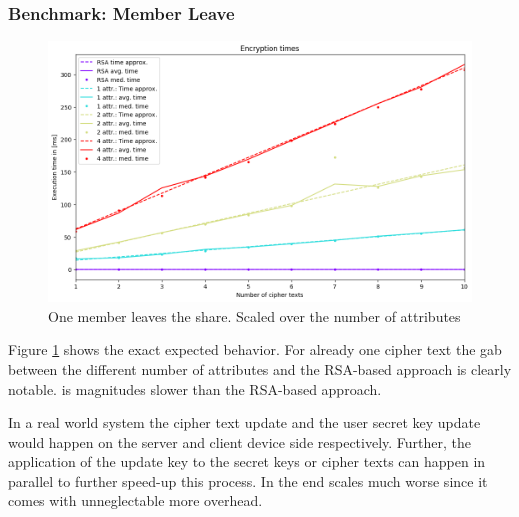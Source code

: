 \subsubsection{Benchmark: Member Leave}
\begin{figure}[!ht]
\centering
    \includegraphics[width=\linewidth]{img/eval-leave/leave_attr_1_users_2.png}
    \caption{One member leaves the share. Scaled over the number of attributes}
    \label{fig:member-leave}
\end{figure}

Figure \ref{fig:member-leave} shows the exact expected behavior. For already one cipher text the gab between the different number of attributes and the RSA-based approach is clearly notable. \name is magnitudes slower than the RSA-based approach.

In a real world system the cipher text update and the user secret key update would happen on the server and client device side respectively. Further, the application of the update key to the secret keys or cipher texts can happen in parallel to further speed-up this process. In the end \name scales much worse since it comes with unneglectable more overhead. 
